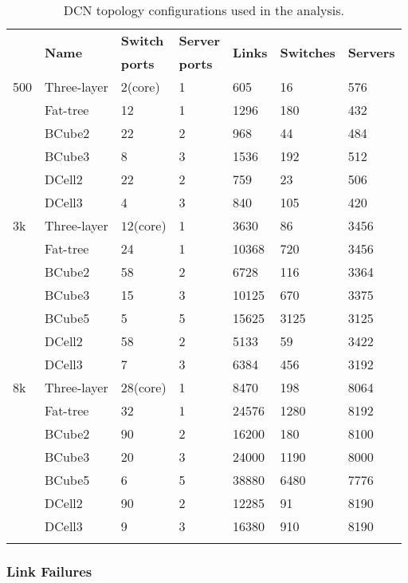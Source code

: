 \begin{table}
\caption{DCN topology configurations used in the analysis.}
\label{tab:configurations}
\begin{tabular}{lllllll}
\hline\noalign{\smallskip}
\hline \multirow{2}{*}{\bf Size}	&\multirow{2}{*}{\bf Name} 	& {\bf Switch} &{\bf Server} &\multirow{2}{*}{\bf Links} &\multirow{2}{*}{\bf Switches} &\multirow{2}{*}{\bf Servers}\\
& &  {\bf ports} & {\bf ports} &  & &\\ 
\noalign{\smallskip}\hline\noalign{\smallskip}
\hline\multirow{6}{*} {500} & Three-layer & $2$(core) & 1 & 605 & 16 & 576\\
& Fat-tree & 12 & 1 & 1296 & 180 & 432\\
& BCube2 & 22 & 2 & 968 & 44 & 484\\
& BCube3 & 8 & 3 & 1536 & 192 & 512\\
& DCell2 & 22 & 2 & 759 & 23 & 506\\
& DCell3 & 4 & 3 & 840 & 105 & 420\\
\noalign{\smallskip}\hline	
\multirow{7}{*} {3k} & Three-layer & $12$(core)  & 1 & 3630 & 86 & 3456\\
& Fat-tree & 24 & 1 & 10368 & 720 & 3456\\
& BCube2 & 58 & 2 & 6728 & 116 & 3364\\
& BCube3 & 15 & 3 & 10125 & 670 & 3375\\
& BCube5 & 5 & 5 & 15625 & 3125 & 3125\\
& DCell2 & 58 & 2 & 5133 & 59 & 3422\\
& DCell3 & 7 & 3 & 6384 & 456 & 3192\\
\noalign{\smallskip}\hline	
\multirow{7}{*} {8k} & Three-layer & $28$(core)  & 1 & 8470 & 198 & 8064\\
& Fat-tree & 32 & 1 & 24576 & 1280 & 8192\\
& BCube2 & 90 & 2 & 16200 & 180 & 8100\\
& BCube3 & 20 & 3 & 24000 & 1190 & 8000\\
& BCube5 & 6 & 5 & 38880 & 6480 & 7776\\
& DCell2 & 90 & 2 & 12285 & 91 & 8190\\
& DCell3 & 9 & 3 & 16380 & 910 & 8190\\
\noalign{\smallskip}\hline	
\end{tabular}
\end{table}

\subsubsection{Link Failures}
\label{sec:perfEvaluationLinkReliable}

